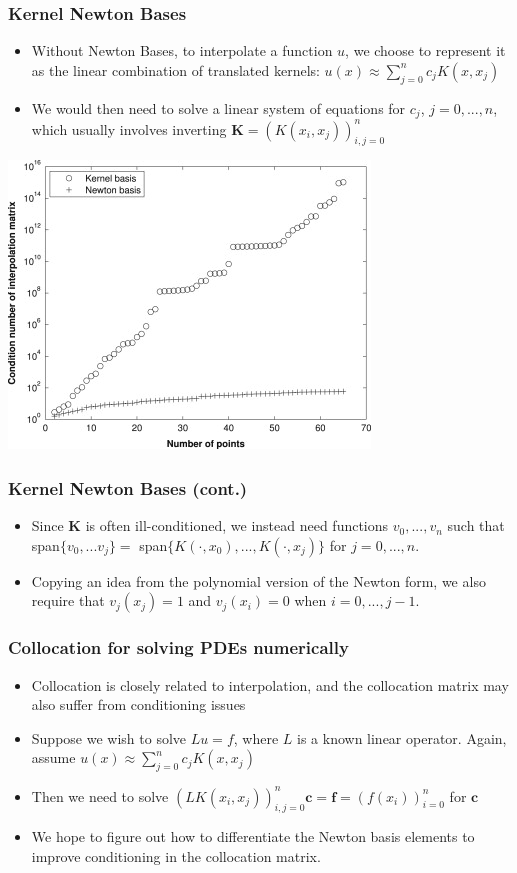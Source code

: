 \documentclass{beamer}
\begin{document}
\begin{frame}
\frametitle{Kernel Newton Bases}
\begin{itemize}
\item Without Newton Bases, to interpolate a function $u$, we choose to represent it as the linear combination of translated kernels: $u(x) \approx \sum_{j=0}^n c_j K(x, x_j)$
\item We would then need to solve a linear system of equations for $c_j$, $j=0,...,n$, which usually involves inverting $\mathbf{K} = (K(x_i,x_j))_{i,j=0}^n$
\end{itemize}
\centering\includegraphics[scale=0.6]{ill_cond}

\end{frame}

\begin{frame}
\frametitle{Kernel Newton Bases (cont.)}
\begin{itemize}
\item Since $\mathbf{K}$ is often ill-conditioned, we instead need functions $v_0, ..., v_n$ such that span$\{ v_0, ... v_j \} = $ span$\{K(\cdot, x_0), ..., K(\cdot, x_j)\}$ for $j=0,...,n$. %
\item Copying an idea from the polynomial version of the Newton form, we also require that $v_j(x_j) = 1$ and $v_j(x_i) = 0$ when $i = 0, ..., j-1$.
\end{itemize}
\end{frame}

\begin{frame}
\frametitle{Collocation for solving PDEs numerically}
\begin{itemize}
\item Collocation is closely related to interpolation, and the collocation matrix may also suffer from conditioning issues
\item Suppose we wish to solve $Lu = f$, where $L$ is a known linear operator. Again, assume $u(x) \approx \sum_{j=0}^n c_j K(x, x_j)$
\item Then we need to solve  $(LK(x_i, x_j))_{i,j=0}^n \mathbf{c} = \mathbf{f} = (f(x_i))_{i=0}^n$ for $\mathbf{c}$ 
\item We hope to figure out how to differentiate the Newton basis elements to improve conditioning in the collocation matrix.
\end{itemize}
\end{frame}
\end{document}

